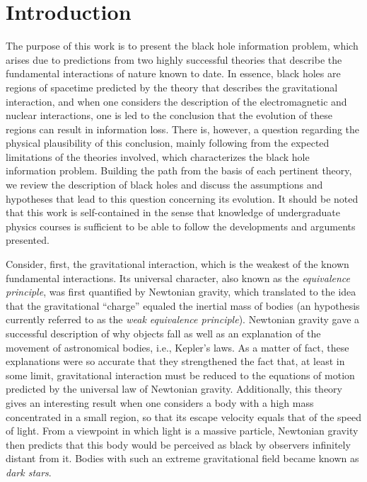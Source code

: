 \documentclass[
12pt,		%
openright,	%
twoside,  %
a4paper,			%
chapter=TITLE,		%
english,			%
french,				%
spanish,			%
brazil				%
]{USPSC-classe/USPSC}
\begin{document}
\listoffigures*
\cleardoublepage


\tableofcontents*
\cleardoublepage


\textual
\chapter[Introduction]{Introduction}\label{Introduction}


The purpose of this work is to present the black hole information problem, which arises due to predictions from two highly successful theories that describe the fundamental interactions of nature known to date. In essence, black holes are regions of spacetime predicted by the theory that describes the gravitational interaction, and when one considers the description of the electromagnetic and nuclear interactions, one is led to the conclusion that the evolution of these regions can result in information loss. There is, however, a question regarding the physical plausibility of this conclusion, mainly following from the expected limitations of the theories involved, which characterizes the black hole information problem. Building the path from the basis of each pertinent theory, we review the description of black holes and discuss the assumptions and hypotheses that lead to this question concerning its evolution. It should be noted that this work is self-contained in the sense that knowledge of undergraduate physics courses is sufficient to be able to follow the developments and arguments presented.

Consider, first, the gravitational interaction, which is the weakest of the known fundamental interactions. Its universal character, also known as the \textit{equivalence principle}, was first quantified by Newtonian gravity, which translated to the idea that the gravitational ``charge'' equaled the inertial mass of bodies (an hypothesis currently referred to as the \textit{weak equivalence principle}). Newtonian gravity gave a successful description of why objects fall as well as an explanation of the movement of astronomical bodies, i.e., Kepler's laws. As a matter of fact, these explanations were so accurate that they strengthened the fact that, at least in some limit, gravitational interaction must be reduced to the equations of motion predicted by the universal law of Newtonian gravity. Additionally, this theory gives an interesting result when one considers a body with a high mass concentrated in a small region, so that its escape velocity equals that of the speed of light. From a viewpoint in which light is a massive particle, Newtonian gravity then predicts that this body would be perceived as black by observers infinitely distant from it. Bodies with such an extreme gravitational field became known as \textit{dark stars}.
\end{document}
